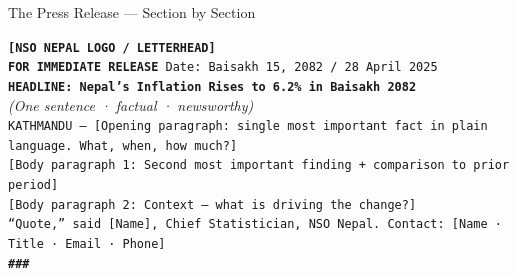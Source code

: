 \documentclass[xcolor={table,dvipsnames},aspectratio=169,11pt]{beamer}
\begin{document}
\begin{frame}[fragile]{The Press Release --- Section by Section}
    \begin{tcolorbox}[colback=white, colframe=nsoBlue, arc=4pt, title=Press Release Structure, coltitle=white, boxrule=1pt]
    \tiny
    \texttt{\textbf{[NSO NEPAL LOGO / LETTERHEAD]}} \\
    \texttt{\textbf{FOR IMMEDIATE RELEASE} \hfill Date: Baisakh 15, 2082 / 28 April 2025} \\[3pt]
    \texttt{\textbf{HEADLINE: Nepal's Inflation Rises to 6.2\% in Baisakh 2082}} \\
    \textit{\scriptsize (One sentence · factual · newsworthy)} \\[3pt]
    \texttt{KATHMANDU — [Opening paragraph: single most important fact in plain language. What, when, how much?]} \\[2pt]
    \texttt{[Body paragraph 1: Second most important finding + comparison to prior period]} \\[2pt]
    \texttt{[Body paragraph 2: Context — what is driving the change?]} \\[2pt]
    \texttt{``Quote,'' said [Name], Chief Statistician, NSO Nepal. \hfill Contact: [Name · Title · Email · Phone]} \\[2pt]
    \hfill \texttt{\textbf{\#\#\#}}
    \end{tcolorbox}
\end{frame}
\end{document}
